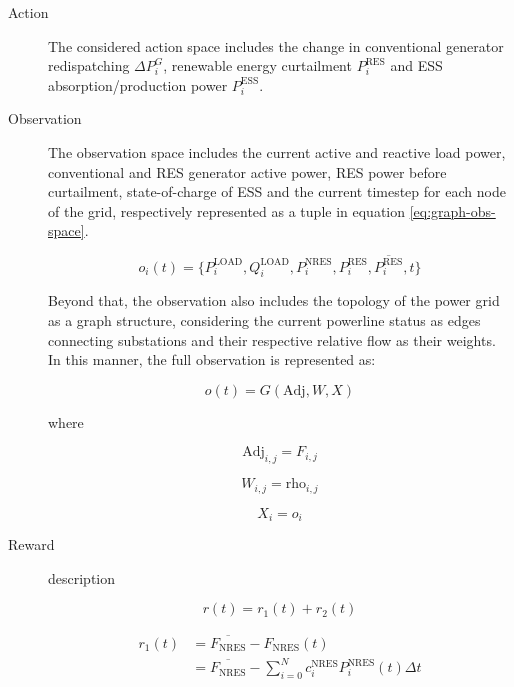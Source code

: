 \begin{description}
	\item[Action] The considered action space includes the change in conventional generator redispatching $\Delta P^G_i$, renewable energy curtailment $P^\text{RES}_i$ and \ac{ESS} absorption/production power $P^\text{ESS}_i$.
	
	\item[Observation] The observation space includes the current active and reactive load power, conventional and \ac{RES} generator active power, \ac{RES} power before curtailment, state-of-charge of \ac{ESS} and the current timestep for each node of the grid, respectively represented as a tuple in equation \ref{eq:graph-obs-space}.
	
	\begin{equation} \label{eq:graph-obs-space}
		o_i(t) = \{P^\text{LOAD}_i, Q^\text{LOAD}_i, P^\text{NRES}_i, P^\text{RES}_i, \overline{P^\text{RES}_i}, t\}
	\end{equation}
	
	Beyond that, the observation also includes the topology of the power grid as a graph structure, considering the current powerline status as edges connecting substations and their respective relative flow as their weights. In this manner, the full observation is represented as:
	
	\begin{equation}
		o(t) = G(\text{Adj}, W, X)
	\end{equation}
	
	where 
	
	\begin{equation}
		\text{Adj}_{i,j} = F_{i,j}
	\end{equation}
	
	\begin{equation}
		W_{i,j} = \text{rho}_{i,j}
	\end{equation}
	
	\begin{equation}
		X_i = o_i
	\end{equation}
	
	\item[Reward] description
	
	\begin{equation}
		r(t) = r_1(t) + r_2(t)
	\end{equation}
	
	\begin{equation}
		\begin{split}
			r_1(t) &= \overline{F_\text{NRES}} - F_\text{NRES}(t) \\
			&= \overline{F_\text{NRES}} - \sum^N_{i=0} c^\text{NRES}_i P^\text{NRES}_i(t) \Delta t
		\end{split}
	\end{equation}
	

\end{description}
